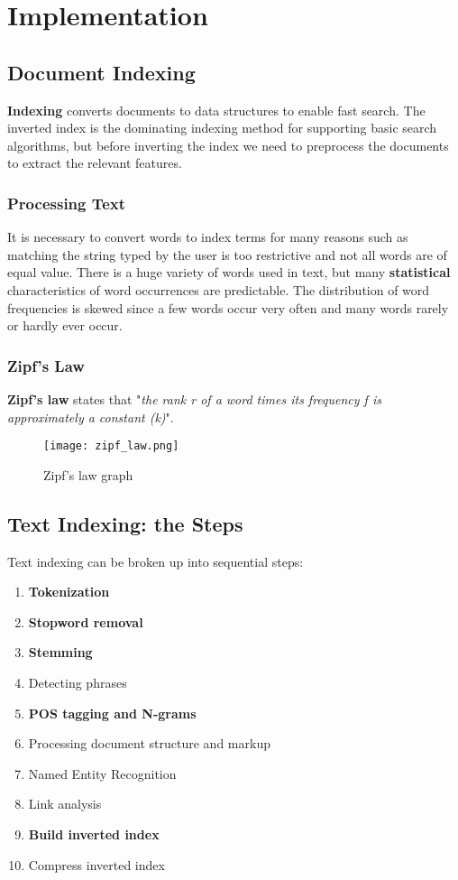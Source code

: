 \documentclass{article}
\begin{document}
\section{Implementation}
\subsection{Document Indexing}
\textbf{Indexing} converts documents to data structures to enable fast search. The inverted index is the dominating indexing method for supporting basic search algorithms, but before inverting the index we need to preprocess the documents to extract the relevant features.
\subsubsection{Processing Text}
It is necessary to convert words to index terms for many reasons such as matching the string typed by the user is too restrictive and not all words are of equal value. There is a huge variety of words used in text, but many \textbf{statistical} characteristics of word occurrences are predictable. The distribution of word frequencies is skewed since a few words occur very often and many words rarely or hardly ever occur.
\subsubsection{Zipf's Law}
\textbf{Zipf's law} states that "\textit{the rank r of a word times its frequency f is approximately a constant (k)}".
\begin{figure}[h]
    \centering
    \texttt{[image: zipf\_law.png]}
    \caption{Zipf's law graph}
\end{figure}
\newpage
\subsection{Text Indexing: the Steps}
Text indexing can be broken up into sequential steps:
\begin{enumerate}
    \item \textbf{Tokenization}
    \item \textbf{Stopword removal}
    \item \textbf{Stemming}
    \item Detecting phrases
    \item \textbf{POS tagging and N-grams}
    \item Processing document structure and markup
    \item Named Entity Recognition
    \item Link analysis
    \item \textbf{Build inverted index}
    \item Compress inverted index
\end{enumerate}
\end{document}
